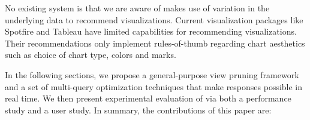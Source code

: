





No existing system is that we are aware of makes use of variation in the underlying
data to recommend visualizations. 
 Current visualization packages like Spotfire and Tableau have limited capabilities for 
recommending visualizations.
Their recommendations only implement rules-of-thumb regarding chart aesthetics such as choice of
chart type, colors and marks.

In the following sections, we propose a general-purpose view pruning framework and a set
of multi-query optimization techniques that make responses possible in real time.
We then present experimental evaluation of \SeeDB via both a performance study and a user study.
In summary, the contributions of this paper are:


